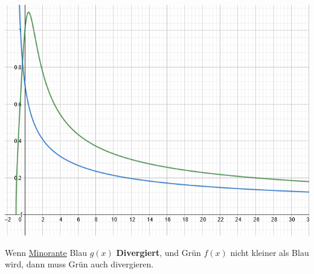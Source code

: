 \begin{center}
	\begin{minipage}{0.2\textwidth}
		\includegraphics[width=\linewidth]{Images/minorante}
	\end{minipage}%
	\begin{minipage}{0.25\textwidth}
		\noindent Wenn \underline{Minorante} Blau $g(x)$ \textbf{Divergiert}, und Grün $f(x)$ nicht kleiner als Blau wird, dann muss Grün auch divergieren.
	\end{minipage}
\end{center}

